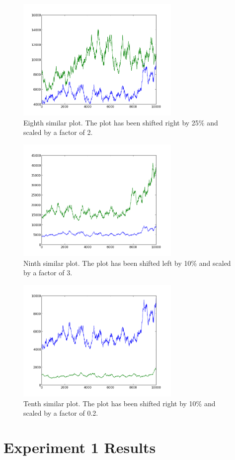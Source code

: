 \begin{figure}[h!]
    \centering
    \includegraphics[width=0.7\textwidth]{images/mutant_8.png}
    \caption{Eighth similar plot.  The plot has been shifted right by 25\% and scaled by a factor of 2.}
    \label{fig:mutant_8}
\end{figure}

\begin{figure}[h!]
    \centering
    \includegraphics[width=0.7\textwidth]{images/mutant_9.png}
    \caption{Ninth similar plot.  The plot has been shifted left by 10\% and scaled by a factor of 3.}
    \label{fig:mutant_9}
\end{figure}

\begin{figure}[h!]
    \centering
    \includegraphics[width=0.7\textwidth]{images/mutant_10.png}
    \caption{Tenth similar plot.  The plot has been shifted right by 10\% and scaled by a factor of 0.2.}
    \label{fig:mutant_10}
\end{figure}

\section{Experiment 1 Results}
\label{sec:experiment1}
